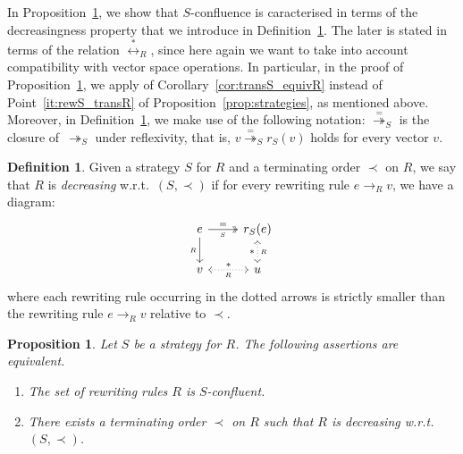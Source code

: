 \documentclass[11pt]{article}
\newtheorem{proposition}[theorem]{Proposition}
\theoremstyle{definition}
\newtheorem{definition}[theorem]{Definition}
\newcommand\rewR{\to_R}
\newcommand\parS{\twoheadrightarrow_S}
\newcommand\equivR{\overset{*}{\leftrightarrow}_R}
\begin{document}
In Proposition~\ref{prop:S-conf_decreasing}, we show that $S$-confluence
is caracterised in terms of the decreasingness property that we introduce
in Definition~\ref{def:decreasing}. The later is stated in terms of the
relation $\equivR$, since here again we want to take into account
compatibility with vector space operations. In particular, in the proof
of Proposition~\ref{prop:S-conf_decreasing}, we apply of
Corollary~\ref{cor:transS_equivR} instead of Point~\ref{it:rewS_transR}
of Proposition~\ref{prop:strategies}, as mentioned above. Moreover, in
Definition~\ref{def:decreasing}, we make use of the following notation: 
$\overset{=}{\twoheadrightarrow}_S$ is the closure of~$\parS$ under
reflexivity, that is, $v\overset{=}{\twoheadrightarrow}_Sr_S(v)$ holds 
for every vector $v$.
\smallskip

\begin{definition}\label{def:decreasing}
  Given a strategy $S$ for $R$ and a terminating order $\prec$ on $R$, we
  say that $R$ is {\em decreasing} w.r.t.\ $(S,\prec)$ if for every
  rewriting rule $e\rewR v$, we have a diagram:
  \[\begin{tikzcd}
      e\ar[d, "_R"']\ar[r, twoheadrightarrow, "=", "_S"'] &
      r_S(e)\ar[d, leftrightarrow, dotted, "*"', "_R"]\\
      v\ar[r, leftrightarrow, dotted, "*", "_R"'] & u
    \end{tikzcd}\]
  where each rewriting rule occurring in the dotted arrows is strictly
  smaller than the rewriting rule $e\rewR v$ relative to $\prec$.
\end{definition}
\smallskip

\begin{proposition}\label{prop:S-conf_decreasing}
  Let $S$ be a strategy for $R$. The following assertions are equivalent.
  \begin{enumerate}
  \item The set of rewriting rules $R$ is $S$-confluent.
  \item There exists a terminating order $\prec$ on $R$ such that $R$ is
    decreasing w.r.t.\ $(S,\prec)$.
  \end{enumerate}
\end{proposition}
\end{document}
